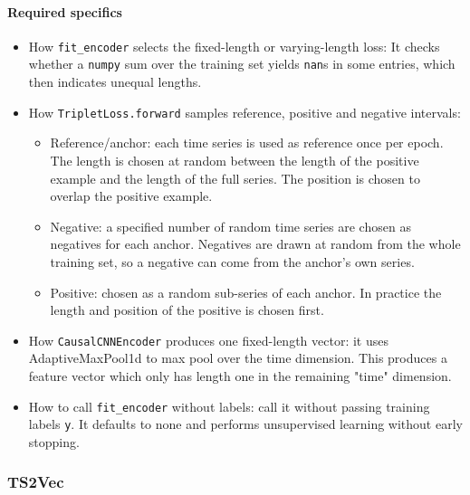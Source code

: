 \documentclass[a4paper,11pt]{article}
\newcommand{\code}[1]{\texttt{#1}}
\begin{document}
\paragraph{Required specifics}
\begin{itemize}
    \item How \code{fit\_encoder} selects the fixed-length or varying-length loss: It checks whether a \texttt{numpy} sum over the training set yields \texttt{nan}s in some entries, which then indicates unequal lengths.
    \item How \code{TripletLoss.forward} samples reference, positive and negative intervals: 
    \begin{itemize}
    \item Reference/anchor: each time series is used as reference once per epoch. The length is chosen at random between the length of the positive example and the length of the full series. The position is chosen to overlap the positive example.
    \item Negative: a specified number of random time series are chosen as negatives for each anchor. Negatives are drawn at random from the whole training set, so a negative can come from the anchor's own series.
    \item Positive: chosen as a random sub-series of each anchor. In practice the length and position of the positive is chosen first.
    \end{itemize}
    \item How \code{CausalCNNEncoder} produces one fixed-length vector: it uses AdaptiveMaxPool1d to max pool over the time dimension. This produces a feature vector which only has length one in the remaining "time" dimension.
    \item How to call \code{fit\_encoder} without labels: call it without passing training labels \texttt{y}. It defaults to none and performs unsupervised learning without early stopping.
\end{itemize}

\subsubsection{TS2Vec}
\end{document}
